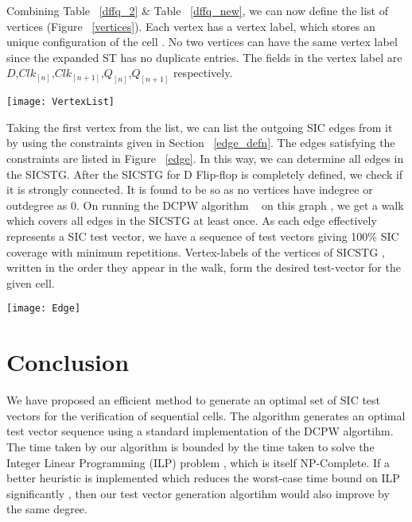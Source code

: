 \documentclass[final]{ieee}
\begin{document}
Combining Table ~\ref{dffq_2} \& Table ~\ref{dffq_new}, we can now define the list of vertices (Figure ~\ref{vertices}). Each vertex has a vertex label, which stores an unique configuration of the cell . No two vertices can have the same vertex label since the expanded ST has no duplicate entries. The fields in the vertex label are $D$,$Clk_{[n] }$,$Clk_{[n+1]}$,$Q_{[n]}$,$Q_{[n+1]}$ respectively.

\begin{figure*}[hbt]
\texttt{[image: VertexList]} 
\caption{Vertices for D flip-flop}
\label{vertices}
\end{figure*}

Taking the first vertex from the list, we can list the outgoing SIC edges from it by using the constraints given in Section ~\ref{edge_defn}. The edges satisfying the constraints are listed in Figure ~\ref{edge}. In this way, we can determine all edges in the SICSTG. After the SICSTG for D Flip-flop is completely defined, we check if it is strongly connected. It is found to be so as no vertices have indegree or outdegree as 0. On running the DCPW algorithm ~\cite{CPP} on this graph , we get a walk which covers all edges in the SICSTG at least once. As each edge effectively represents a SIC test vector, we have a sequence of test vectors giving 100\% SIC coverage with minimum repetitions. Vertex-labels of the vertices of SICSTG , written in the order they appear in the walk, form the desired test-vector for the given cell. 

\begin{figure*}[hbt]
\texttt{[image: Edge]} 
\caption{Outgoing edges from vertex labelled $0,0,1,0,0$}
\label{edge}
\end{figure*}

\section{Conclusion}
We have proposed an efficient method to generate an optimal set of SIC test vectors for the verification of sequential cells. The algorithm generates an optimal test vector sequence using a standard implementation of the DCPW algortihm. The time taken by our algorithm is bounded by the time taken to solve the Integer Linear Programming (ILP) problem , which is itself NP-Complete. If a better heuristic is implemented which reduces the worst-case time bound on ILP significantly , then our test vector generation algortihm would also improve by the same degree.
\pagebreak
\end{document}
